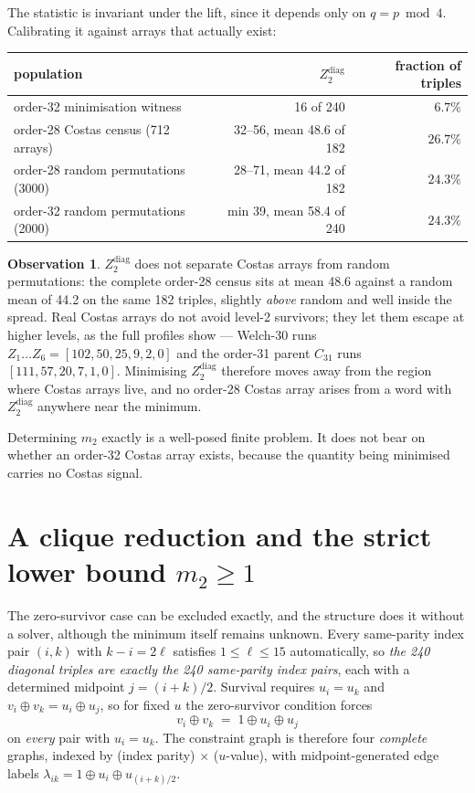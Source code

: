\documentclass[11pt,a4paper,oneside]{report}
\theoremstyle{definition}
\newtheorem{observation}[theorem]{Observation}
\begin{document}
The statistic is invariant under the lift, since it depends only on
$q=p\bmod 4$. Calibrating it against arrays that actually exist:

\begin{center}
\begin{tabular}{@{}lrr@{}}
\toprule
population & $Z_2^{\mathrm{diag}}$ & fraction of triples \\
\midrule
order-32 minimisation witness & 16 of 240 & $6.7\%$ \\
order-28 Costas census (712 arrays) & 32--56, mean 48.6 of 182 & $26.7\%$ \\
order-28 random permutations (3000) & 28--71, mean 44.2 of 182 & $24.3\%$ \\
order-32 random permutations (2000) & min 39, mean 58.4 of 240 & $24.3\%$ \\
\bottomrule
\end{tabular}
\end{center}

\begin{observation}
\label{p7-obs:m2}
$Z_2^{\mathrm{diag}}$ does not separate Costas arrays from random permutations:
the complete order-28 census sits at mean 48.6 against a random mean of 44.2 on
the same 182 triples, slightly \emph{above} random and well inside the spread.
Real Costas arrays do not avoid level-2 survivors; they let them escape at higher
levels, as the full profiles show --- Welch-30 runs
$Z_1\ldots Z_6=[102,50,25,9,2,0]$ and the order-31 parent $C_{31}$ runs
$[111,57,20,7,1,0]$. Minimising $Z_2^{\mathrm{diag}}$ therefore moves away from
the region where Costas arrays live, and no order-28 Costas array arises from a
word with $Z_2^{\mathrm{diag}}$ anywhere near the minimum.
\end{observation}

Determining $m_2$ exactly is a well-posed finite problem. It does not bear on
whether an order-32 Costas array exists, because the quantity being minimised
carries no Costas signal.

\section{A clique reduction and the strict lower bound $m_2\ge1$}

The zero-survivor case can be excluded exactly, and the structure does it without a solver,
although the minimum itself remains unknown. Every same-parity index pair $(i,k)$ with $k-i=2\ell$ satisfies
$1\le\ell\le15$ automatically, so \emph{the 240 diagonal triples are exactly the
240 same-parity index pairs}, each with a determined midpoint $j=(i+k)/2$.
Survival requires $u_i=u_k$ and $v_i\oplus v_k=u_i\oplus u_j$, so for fixed $u$
the zero-survivor condition forces
\[
v_i\oplus v_k \;=\; 1\oplus u_i\oplus u_j
\]
on \emph{every} pair with $u_i=u_k$. The constraint graph is therefore four
\emph{complete} graphs, indexed by (index parity) $\times$ ($u$-value), with
midpoint-generated edge labels $\lambda_{ik}=1\oplus u_i\oplus u_{(i+k)/2}$.
\end{document}
